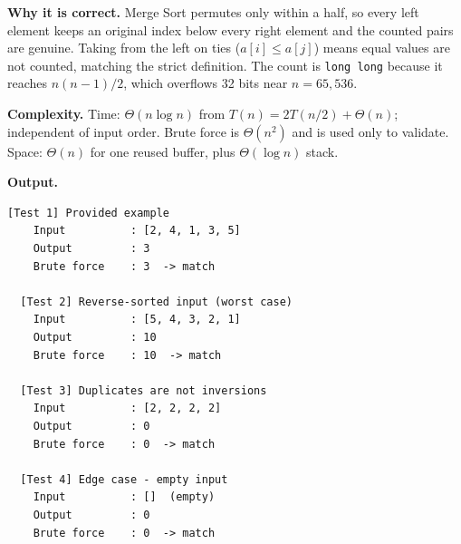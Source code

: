 \documentclass[11pt]{article}
\begin{document}
\textbf{Why it is correct.} Merge Sort permutes only within a half, so every left element keeps an original index below every right element and the counted pairs are genuine. Taking from the left on ties ($a[i] \le a[j]$) means equal values are not counted, matching the strict definition. The count is \texttt{long long} because it reaches $n(n-1)/2$, which overflows 32 bits near $n = 65{,}536$.

\textbf{Complexity.} Time: $\Theta(n\log n)$ from $T(n)=2T(n/2)+\Theta(n)$; independent of input order. Brute force is $\Theta(n^2)$ and is used only to validate.\\
Space: $\Theta(n)$ for one reused buffer, plus $\Theta(\log n)$ stack.

\textbf{Output.}

\begin{lstlisting}[style=term]
  [Test 1] Provided example
    Input          : [2, 4, 1, 3, 5]
    Output         : 3
    Brute force    : 3  -> match

  [Test 2] Reverse-sorted input (worst case)
    Input          : [5, 4, 3, 2, 1]
    Output         : 10
    Brute force    : 10  -> match

  [Test 3] Duplicates are not inversions
    Input          : [2, 2, 2, 2]
    Output         : 0
    Brute force    : 0  -> match

  [Test 4] Edge case - empty input
    Input          : []  (empty)
    Output         : 0
    Brute force    : 0  -> match
\end{lstlisting}
\end{document}
